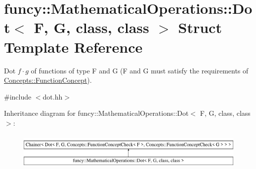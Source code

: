 \hypertarget{structfuncy_1_1MathematicalOperations_1_1Dot}{\section{funcy\-:\-:Mathematical\-Operations\-:\-:Dot$<$ F, G, class, class $>$ Struct Template Reference}
\label{structfuncy_1_1MathematicalOperations_1_1Dot}
}


Dot $f \cdot g$ of functions of type F and G (F and G must satisfy the requirements of \hyperlink{structfuncy_1_1Concepts_1_1FunctionConcept}{Concepts\-::\-Function\-Concept}).  




{\ttfamily \#include $<$dot.\-hh$>$}

Inheritance diagram for funcy\-:\-:Mathematical\-Operations\-:\-:Dot$<$ F, G, class, class $>$\-:\begin{figure}[H]
\begin{center}
\leavevmode
\includegraphics[height=1.797753cm]{structfuncy_1_1MathematicalOperations_1_1Dot}
\end{center}
\end{figure}
